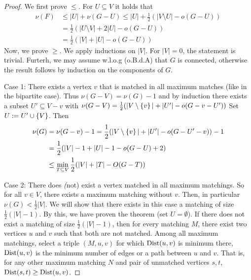 \begin{proof}
	We first prove $\leq$. For $U \subseteq V$ it holds that 
	\begin{align*}
		\nu(F) &\leq |U| + \nu(G-U) \leq |U| + \frac{1}{2} (| V \setminus U| - o(G-U)) \\
		       &= \frac{1}{2}(|U \setminus V| + 2 |U| - o(G-U)) \\
					 &= \frac{1}{2}(|V| + |U| - o(G-U))
	\end{align*}
	Now, we prove $\geq$. We apply inductions on $|V|$. For $|V| = 0$, the statement is trivial.
	Furterh, we may assume w.l.o.g (o.B.d.A) that $G$ is connected, otherwise the
	result follows by induction on the components of $G$.
	
	Case 1:\newline
	There exists a vertex $v$ that is matched in all maximum matches (like in the 
	bipartite case). Thus $\nu (G-V) = \nu (G)-1$ and by induction there exists
	a subset $U'\subseteq V-v$ with $\nu (G-V) = \frac{1}{2}(|V\setminus \left\{v\right\}|+ |U'|-o(G-v-U'))$
	Set $U:=U' \cup \left\{V\right\}$. Then \begin{align*}
		\nu(G) &= \nu(G-v)-1=\frac{1}{2}(|V\setminus \left\{v\right\}|+ |U'| - o(G-U'-v))-1 \\
		       &= \frac12 (|V| - 1 + |U| - 1 - o(G-U) + 2) \\
					 &\leq \min_{T \subseteq V}\frac12(|V|+|T| -O(G-T))
	\end{align*}
	
	Case 2:\newline
	There does \emph(not) exist a vertex matched in all maximum matchings. So for 
	all $v \in V$, there exists a maximum matching without $v$. Then, in particular
	$\nu(G)<\frac12|V|$. We will show that there exists in this case a matching 
	of size $\frac12(|V|-1)$. By this, we have proven the theorem (set $U=\emptyset$).
	\newline
	If there does not exist a matching of size $\frac12(|V|-1)$, then for every
	matching $M$, there exist two vertices $u$ and $v$ such that both are not 
	matched. Among all maximum matchings, select a triple $(M,u,v)$ for which 
	$\operatorname{Dist}(u,v)$ is minimum there, $\operatorname{Dist}(u,v)$ is the minimum number of edges 
	or a path between $u$ and $v$. That is, for any other maximum matching $N$
	and pair of unmatched vertices $s,t$, $\operatorname{Dist}(s,t) \geq \operatorname{Dist}(u,v)$.
	

\end{proof}
